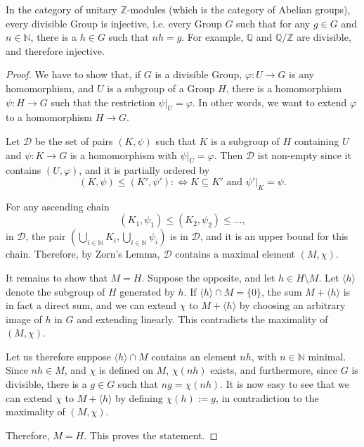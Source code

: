 \documentclass[12pt]{article}
\begin{document}
In the category of unitary $\mathbb{Z}$-modules (which is the category of Abelian groups), every divisible Group is injective, i.e. every Group $G$ such that for any $g \in G$ and $n \in \mathbb{N}$, there is a $h \in G$ such that $nh = g$. For example, $\mathbb{Q}$ and $\mathbb{Q}/\mathbb{Z}$ are divisible, and therefore injective.

\begin{proof}
We have to show that, if $G$ is a divisible Group, $\varphi: U \to G$ is any homomorphism, and $U$ is a subgroup of a Group $H$, there is a homomorphism $\psi: H \to G$ such that the restriction $\psi|_U = \varphi$. In other words, we want to extend $\varphi$ to a homomorphism $H \to G$.

Let $\mathcal{D}$ be the set of pairs $(K, \psi)$ such that $K$ is a subgroup of $H$ containing $U$ and $\psi: K \to G$ is a homomorphism with $\psi|_U = \varphi$. Then $\mathcal{D}$ ist non-empty since it contains $(U, \varphi)$, and it is partially ordered by
\[ (K, \psi) \leq (K', \psi') :\Longleftrightarrow K \subseteq K' \text{ and } \psi'|_K = \psi. \]

For any ascending chain
\[ (K_1, \psi_1) \leq (K_2, \psi_2) \leq \dots, \]
in $\mathcal{D}$, the pair $(\bigcup_{i \in \mathbb{N}} K_i, \bigcup_{i \in \mathbb{N}} \psi_i)$ is in $\mathcal{D}$, and it is an upper bound for this chain. Therefore, by Zorn's Lemma, $\mathcal{D}$ contains a maximal element $(M, \chi)$.

It remains to show that $M = H$. Suppose the opposite, and let $h \in H \setminus M$. Let $\langle h \rangle$ denote the subgroup of $H$ generated by $h$. If $\langle h \rangle \cap M = \{0\}$, the sum $M + \langle h \rangle$ is in fact a direct sum, and we can extend $\chi$ to $M + \langle h \rangle$ by choosing an arbitrary image of $h$ in $G$ and extending linearly. This contradicts the maximality of $(M, \chi)$.

Let us therefore suppose $\langle h \rangle \cap M$ contains an element $nh$, with $n \in \mathbb{N}$ minimal. Since $nh \in M$, and $\chi$ is defined on $M$, $\chi(nh)$ exists, and furthermore, since $G$ is divisible, there is a $g \in G$ such that $ng = \chi(nh)$. It is now easy to see that we can extend $\chi$ to $M + \langle h \rangle$ by defining $\chi(h) := g$, in contradiction to the maximality of $(M, \chi)$.

Therefore, $M = H$. This proves the statement.
\end{proof}
\end{document}
